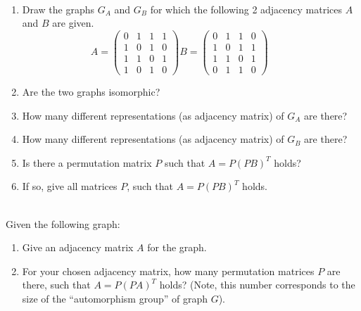 \documentclass[10pt]{article}
\begin{document}
\\
\begin{enumerate}
\item Draw the graphs $G_A$ and $G_B$ for which the following 2 adjacency matrices $A$ and $B$ are given.
\begin{equation*}
A= \left(\begin{array}{ccccc}
           0 & 1 & 1 & 1  \\
           1 & 0 & 1 & 0  \\
           1 & 1 & 0 & 1  \\
           1 & 0 & 1 & 0  
\end{array}\right)
B= \left(\begin{array}{ccccc}
           0 & 1 & 1 & 0  \\
           1 & 0 & 1 & 1  \\
           1 & 1 & 0 & 1  \\
           0 & 1 & 1 & 0  
\end{array}\right)\hspace{1cm}
\end{equation*}
\item Are the two graphs isomorphic?
\item How many different representations (as adjacency matrix) of $G_A$ are there?
\item How many different representations (as adjacency matrix) of $G_B$ are there?
\item Is there a permutation matrix $P$ such that $A=P\left(PB\right)^T$ holds? 
\item If so, give all matrices $P$, such that  $A=P\left(PB\right)^T$ holds.
\end{enumerate}

\\[1cm]
Given the following graph:\\

\begin{enumerate}
\item Give an adjacency matrix $A$ for the graph.
\item For your chosen adjacency matrix, how many permutation matrices $P$ are there, such that
  $A=P\left(PA\right)^T$ holds? (Note, this number corresponds to the size of the ``automorphism group'' of graph $G$). 
\end{enumerate}
\newpage
\end{document}
